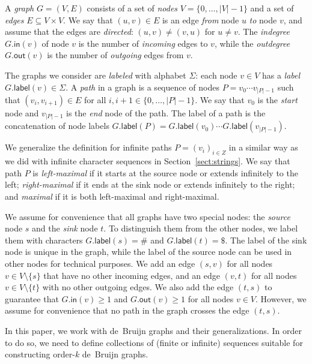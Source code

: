 \documentclass[a4paper,UKenglish]{lipics-v2016}
\newcommand{\set}[1]{\ensuremath{\{ #1 \}}}
\newcommand{\abs}[1]{\ensuremath{\lvert #1 \rvert}}
\newcommand{\gindegree}{\ensuremath{\mathsf{in}}}
\newcommand{\goutdegree}{\ensuremath{\mathsf{out}}}
\newcommand{\glabel}{\ensuremath{\mathsf{label}}}
\newcommand{\orderk}[1]{order\nobreakdash-$#1$}
\begin{document}
A \emph{graph} $G = (V, E)$ consists of a set of \emph{nodes} $V = \set{0, \dotsc, \abs{V}-1}$ and a set of \emph{edges} $E \subseteq V \times V$. We say that $(u, v) \in E$ is an edge \emph{from} node $u$ \emph{to} node $v$, and assume that the edges are \emph{directed}: $(u, v) \ne (v, u)$ for $u \ne v$. The \emph{indegree} $G.\gindegree(v)$ of node $v$ is the number of \emph{incoming} edges to $v$, while the \emph{outdegree} $G.\goutdegree(v)$ is the number of \emph{outgoing} edges from $v$.

The graphs we consider are \emph{labeled} with alphabet $\Sigma$: each node $v \in V$ has a \emph{label} $G.\glabel(v) \in \Sigma$. A \emph{path} in a graph is a sequence of nodes $P = v_{0} \dotsm v_{\abs{P}-1}$ such that $(v_{i}, v_{i+1}) \in E$ for all $i, i+1 \in \set{0, \dotsc, \abs{P}-1}$. We say that $v_{0}$ is the \emph{start} node and $v_{\abs{P}-1}$ is the \emph{end} node of the path. The label of a path is the concatenation of node labels $G.\glabel(P) = G.\glabel(v_{0}) \dotsm G.\glabel(v_{\abs{P}-1})$.

We generalize the definition for infinite paths $P = (v_{i})_{i \in Z}$ in a similar way as we did with infinite character sequences in Section~\ref{sect:strings}. We say that path $P$ is \emph{left-maximal} if it starts at the source node or extends infinitely to the left; \emph{right-maximal} if it ends at the sink node or extends infinitely to the right; and \emph{maximal} if it is both left-maximal and right-maximal.

We assume for convenience that all graphs have two special nodes: the \emph{source} node $s$ and the \emph{sink} node $t$. To distinguish them from the other nodes, we label them with characters $G.\glabel(s) = \#$ and $G.\glabel(t) = \$$. The label of the sink node is unique in the graph, while the label of the source node can be used in other nodes for technical purposes. We add an edge $(s, v)$ for all nodes $v \in V \setminus \set{s}$ that have no other incoming edges, and an edge $(v, t)$ for all nodes $v \in V \setminus \set{t}$ with no other outgoing edges. We also add the edge $(t, s)$ to guarantee that $G.\gindegree(v) \ge 1$ and $G.\goutdegree(v) \ge 1$ for all nodes $v \in V$. However, we assume for convenience that no path in the graph crosses the edge $(t, s)$.

In this paper, we work with de~Bruijn graphs and their generalizations. In order to do so, we need to define collections of (finite or infinite) sequences suitable for constructing \orderk{k} de~Bruijn graphs.
\end{document}
